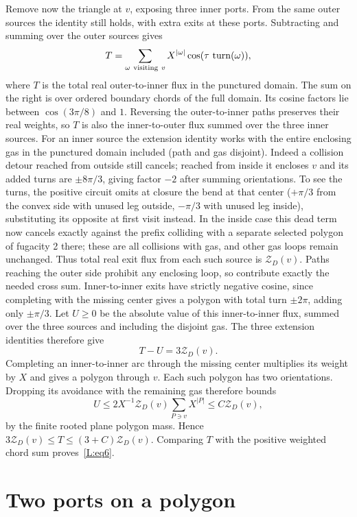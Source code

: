 \documentclass[11pt]{article}
\numberwithin{equation}{section}
\theoremstyle{definition}\newtheorem{definition}[theorem]{Definition}
\theoremstyle{remark}\newtheorem{remark}[theorem]{Remark}
\begin{document}
Remove now the triangle at \(v\), exposing three inner ports. From the same outer sources the identity still holds, with extra exits at these ports. Subtracting and summing over the outer sources gives
\[
 T=\sum_{\omega\ {\rm visiting}\ v}
        X^{|\omega|}\cos(\tau\,\operatorname{turn}(\omega)),
\]
where $T$ is the total real outer-to-inner flux in the punctured domain.
The sum on the right is over ordered boundary chords of the full domain.
Its cosine factors lie between $\cos(3\pi/8)$ and $1$. Reversing the
outer-to-inner paths preserves their real weights, so $T$ is also the
inner-to-outer flux summed over the three inner sources. For an inner source the extension identity works with the entire enclosing gas in the punctured domain included (path and gas disjoint). Indeed a collision detour reached from outside still cancels; reached from inside it encloses \(v\) and its added turns are \(\pm8\pi/3\), giving factor \(-2\) after summing orientations. To see the turns, the positive circuit omits at closure the bend at that center (\(+\pi/3\) from the convex side with unused leg outside, \(-\pi/3\) with unused leg inside), substituting its opposite at first visit instead. In the inside case this dead term now cancels exactly against the prefix colliding with a separate selected polygon of fugacity 2 there; these are all collisions with gas, and other gas loops remain unchanged. Thus total real exit flux from each such source is \(\mathcal Z_D(v)\). Paths reaching the outer side prohibit any enclosing loop, so contribute exactly the needed cross sum. Inner-to-inner exits have strictly negative cosine, since completing with the missing center gives a polygon with total turn \(\pm2\pi\), adding only \(\pm\pi/3\). Let $U\ge0$ be the absolute value of this inner-to-inner flux,
summed over the three sources and including the disjoint gas. The three
extension identities therefore give
\[
                         T-U=3\mathcal Z_D(v).
\]
Completing an inner-to-inner arc through the missing center multiplies
its weight by $X$ and gives a polygon through $v$. Each such polygon
has two orientations. Dropping its avoidance with the remaining gas
therefore bounds
\[
 U\le 2X^{-1}\mathcal Z_D(v)
                   \sum_{P\ni v}X^{|P|}
   \le C\mathcal Z_D(v),
\]
by the finite rooted plane polygon mass. Hence
$3\mathcal Z_D(v)\le T\le(3+C)\mathcal Z_D(v)$. Comparing $T$ with the
positive weighted chord sum proves~\eqref{L:eq6}.


\section{Two ports on a polygon}\label{L:part8}
\end{document}
